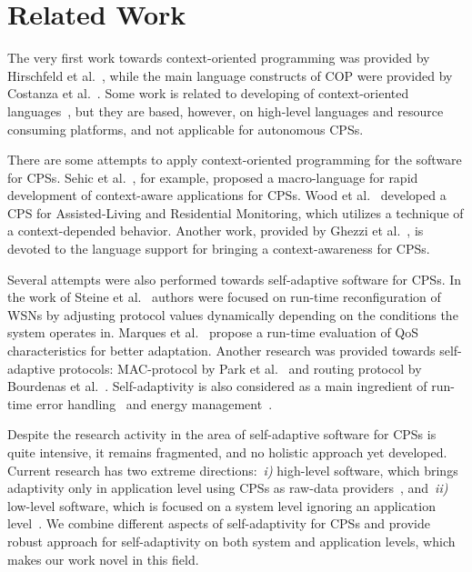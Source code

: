 \section{Related Work}
\label{sec:related}

The very first work towards context-oriented programming was provided by
Hirschfeld et al.~\cite{Hirschfeld08}, while the main language constructs of COP
were provided by Costanza et al.~\cite{Costanza05}. Some work is related to
developing of context-oriented languages~\cite{Sehic11,Kamina11,Bardram05},
but they are based, however, on high-level languages and resource consuming
platforms, and not applicable for autonomous CPSs.

There are some attempts to apply context-oriented programming for the software
for CPSs. Sehic et al.~\cite{Sehic11}, for example, proposed a macro-language
for rapid development of context-aware applications for CPSs. Wood et
al.~\cite{Wood08} developed a CPS for Assisted-Living and Residential
Monitoring, which utilizes a technique of a context-depended behavior. Another
work, provided by Ghezzi et al.~\cite{Ghezzi10}, is devoted to the language
support for bringing a context-awareness for CPSs.

Several attempts were also performed towards self-adaptive software for CPSs. In
the work of Steine et al.~\cite{Steine11} authors were focused on run-time
reconfiguration of WSNs by adjusting protocol values dynamically depending on
the conditions the system operates in. Marques et al.~\cite{Marques11} propose a
run-time evaluation of QoS characteristics for better adaptation. Another
research was provided towards self-adaptive protocols: MAC-protocol by Park et
al.~\cite{Park08} and routing protocol by Bourdenas et al.~\cite{Bourdenas11}.
Self-adaptivity is also considered as a main ingredient of run-time error
handling~\cite{Bourdenas10} and energy management~\cite{Jiang07}.

Despite the research activity in the area of self-adaptive software for CPSs is
quite intensive, it remains fragmented, and no holistic approach yet developed.
Current research has two extreme directions:~\emph{i)} high-level software,
which brings adaptivity only in application level using CPSs as raw-data
providers~\cite{Wood08,Sehic11,Ghezzi10}, and~\emph{ii)} low-level software,
which is focused on a system level ignoring an application
level~\cite{Steine11,Marques11,Park08,Bourdenas11,Bourdenas10,Jiang07}.
We combine different aspects of self-adaptivity for CPSs and provide robust
approach for self-adaptivity on both system and application levels, which makes
our work novel in this field.


